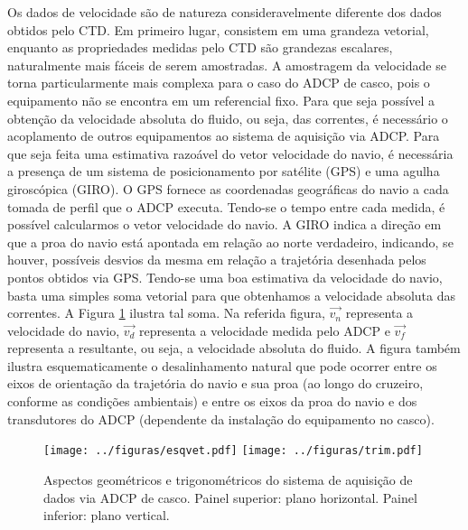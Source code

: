 \hspace{6mm} Os dados de velocidade são de natureza consideravelmente diferente dos dados obtidos pelo CTD.
Em primeiro lugar, consistem em uma grandeza vetorial, enquanto as propriedades medidas
pelo CTD são grandezas escalares, naturalmente mais fáceis de serem amostradas. 
A amostragem da velocidade se torna particularmente mais complexa para o caso do ADCP de casco, pois
o equipamento não se encontra em um referencial
fixo. Para que seja possível a obtenção da velocidade absoluta do fluido, ou seja, das correntes, é 
necessário o acoplamento de outros equipamentos ao sistema de aquisição via ADCP.  Para que seja feita uma 
estimativa razoável do vetor velocidade do navio, é necessária a presença de um sistema de posicionamento 
por satélite (GPS) e uma agulha giroscópica (GIRO). O GPS fornece as coordenadas geográficas do navio a cada tomada
de perfil que o ADCP executa. Tendo-se o tempo entre cada medida, é possível calcularmos o vetor 
velocidade do navio. A GIRO indica a direção em que a proa do navio está apontada em relação ao norte verdadeiro, indicando, 
se houver, possíveis desvios da mesma em relação a trajetória desenhada pelos pontos obtidos via GPS. 
Tendo-se uma boa estimativa da velocidade do navio, basta uma simples soma vetorial para que obtenhamos
a velocidade absoluta das correntes. A Figura \ref{fig:esqvet} ilustra tal soma. Na referida figura,
$\vec{v_n}$ representa a velocidade do navio, $\vec{v_d}$ representa a velocidade medida pelo ADCP e $\vec{v_f}$
representa a resultante, ou seja, a velocidade absoluta do fluido. A figura também ilustra esquematicamente 
o desalinhamento natural que pode ocorrer entre os eixos de orientação da trajetória do navio e sua proa (ao longo 
do cruzeiro, conforme as condições ambientais) e entre os eixos da proa do navio e dos transdutores do ADCP (dependente da
instalação do equipamento no casco). 

\begin{figure}
 \begin{center}
  \texttt{[image: ../figuras/esqvet.pdf]}
  \texttt{[image: ../figuras/trim.pdf]}
 \end{center}
 \vspace{-.25cm}
 \renewcommand{\baselinestretch}{1}
 \caption{\label{fig:esqvet} \small Aspectos geométricos e trigonométricos do sistema de aquisição de 
dados via ADCP de casco. Painel superior: plano horizontal. Painel inferior: plano vertical.}
\end{figure}


